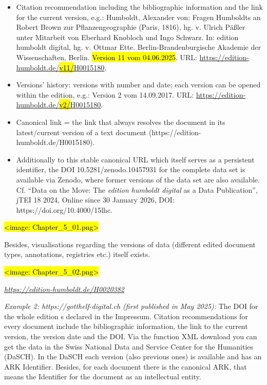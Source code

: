\documentclass[
  letterpaper,
  DIV=11,
  numbers=noendperiod]{scrreprt}
\providecommand{\tightlist}{%
  \setlength{\itemsep}{0pt}\setlength{\parskip}{0pt}}\usepackage{longtable,booktabs,array}
\begin{document}
\begin{itemize}
\item
  Citation recommendation including the bibliographic information and
  the link for the current version, e.g.: Humboldt, Alexander von:
  Fragen Humboldts an Robert Brown zur Pflanzengeographie (Paris, 1816),
  hg. v. Ulrich Päßler unter Mitarbeit von Eberhard Knobloch und Ingo
  Schwarz. In: edition humboldt digital, hg. v. Ottmar Ette.
  Berlin-Brandenburgische Akademie der Wissenschaften, Berlin.
  \hl{Version 11 vom 04.06.2025}. URL:
  \href{https://edition-humboldt.de/v11/H0015180}{https://edition-humboldt.de/\hl{v11/}H0015180}.
\item
  Versions' history: versions with number and date; each version can be
  opened within the edition, e.g.: Version 2 vom 14.09.2017. URL:
  \href{https://edition-humboldt.de/v2/H0015180}{https://edition-humboldt.de/\hl{v2/}H0015180}.
\item
  Canonical link = the link that always resolves the document in its
  latest/current version of a text document
  (https://edition-humboldt.de/H0015180).
\end{itemize}

\begin{itemize}
\tightlist
\item
  Additionally to this stable canonical URL which itself serves as a
  persistent identifier, the DOI 10.5281/zenodo.10457931 for the
  complete data set is available via Zenodo, where former versions of
  the data set are also available. Cf. ``Data on the Move: The
  \emph{edition humboldt digital} as a Data Publication'', jTEI 18
  \textbar{} 2024, Online since 30 January 2026, DOI:
  https://doi.org/10.4000/15lhc.
\end{itemize}

\hl{\textless image: Chapter\_5\_01.png\textgreater{}}

Besides, visualisations regarding the versions of data (different edited
document types, annotations, registries etc.) itself exists.

\hl{\textless image: Chapter\_5\_02.png\textgreater{}}

\emph{\url{https://edition-humboldt.de/H0020382}}

\emph{Example 2: https://gotthelf-digital.ch (first published in May
2025):} The DOI for the whole edition s declared in the Impressum.
Citation recommendations for every document include the bibliographic
information, the link to the current version, the version date and the
DOI. Via the function XML download you can get the data in the Swiss
National Data and Service Center for the Humanities (DaSCH). In the
DaSCH each version (also previous ones) is available and has an ARK
Identifier. Besides, for each document there is the canonical ARK, that
means the Identifier for the document as an intellectual entity.
\end{document}
